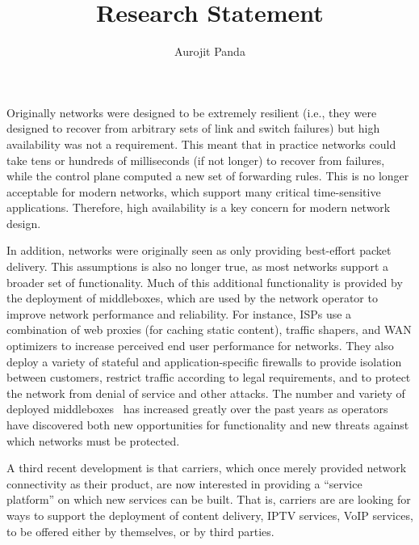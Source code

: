 \documentclass[letterpaper]{article}
\newcommand\eat[1]{}
\begin{document}
\title{\Large Research Statement}
\author{Aurojit Panda}
\date{}
\thispagestyle{empty}
\maketitle
Originally networks were designed to be extremely resilient (i.e., they were designed to recover from arbitrary sets of
link and switch failures) but high availability was not a requirement. This meant that in practice
networks could take tens or hundreds of milliseconds (if not longer) to recover from failures, while the control plane computed  a new
set of forwarding rules. This is no longer acceptable for modern networks, which support many critical time-sensitive
applications. Therefore, high availability is a key concern for modern network design.

In addition, networks were originally seen as only providing best-effort packet delivery. This assumptions is also no
longer true, as most networks support a broader set of functionality. Much of this additional functionality is provided by the deployment of middleboxes, which are
used by the network operator to improve network performance and reliability. For instance, ISPs use a combination of web
proxies (for caching static content), traffic shapers, and WAN optimizers to increase perceived end user performance for
networks. They also deploy a variety of stateful and application-specific firewalls to provide isolation between
customers, restrict traffic according to legal requirements, and to protect the network from denial of service and other
attacks. The number and variety of deployed middleboxes~\cite{sherry2012making} has increased greatly over the past
years as operators have discovered both new opportunities for functionality and new threats against which networks must be
protected.

A third recent development is that carriers, which once merely provided network connectivity as their product, are now
interested in providing a ``service platform'' on which new services can be built. That is, carriers are are looking for
ways to support the deployment of content delivery, IPTV services, VoIP services, to be offered either by themselves, or by third parties.

\eat{Secondly, customers (both end user and content providers) expect networks to be highly available: in particular
requiring little or no disruption during failures. Providing high availability means that networks can no longer wait
for control plane convergence (at least not for tens or hundreds of milliseconds) to restore connectivity (i.e. ensure
that there are paths from a source to a destination). Furthermore, any misconfiguration of middleboxes or switches can
be catastrophic, requiring that customers wait not just for control plane convergence but for human intervention. Modern
networks therefore need to protect against a wide variety of failure scenarios, including not just equipment failure but
also misconfiguration.}
\end{document}
